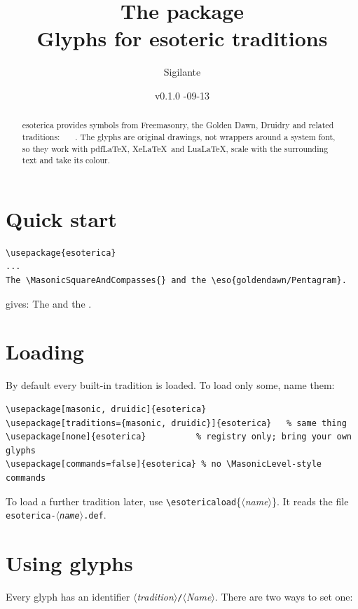 \documentclass[11pt]{article}
\title{The \pkg{esoterica} package\\[0.5ex]
  \large Glyphs for esoteric traditions}
\author{Sigilante}
\date{v0.1.0 \quad 2026-09-13}
\newcommand\pkg[1]{\textsf{#1}}
\newcommand\cs[1]{\texttt{\textbackslash#1}}
\newcommand\meta[1]{\ensuremath{\langle}\textit{#1}\ensuremath{\rangle}}
\begin{document}
\maketitle

\begin{abstract}
\pkg{esoterica} provides symbols from Freemasonry, the Golden Dawn, Druidry
and related traditions: \MasonicSquareAndCompasses\ \GoldenDawnPentagram\
\DruidAwen\ \DruidTriquetra.  The glyphs are original drawings, not wrappers
around a system font, so they work with pdf\LaTeX, Xe\LaTeX\ and Lua\LaTeX,
scale with the surrounding text and take its colour.
\end{abstract}

\tableofcontents

\section{Quick start}

\begin{verbatim}
\usepackage{esoterica}
...
The \MasonicSquareAndCompasses{} and the \eso{goldendawn/Pentagram}.
\end{verbatim}

\noindent gives: The \MasonicSquareAndCompasses{} and the .

\section{Loading}

By default every built-in tradition is loaded.  To load only some, name them:

\begin{verbatim}
\usepackage[masonic, druidic]{esoterica}
\usepackage[traditions={masonic, druidic}]{esoterica}   % same thing
\usepackage[none]{esoterica}          % registry only; bring your own glyphs
\usepackage[commands=false]{esoterica} % no \MasonicLevel-style commands
\end{verbatim}

\noindent To load a further tradition later, use
\cs{esotericaload}\{\meta{name}\}.  It reads the file
\texttt{esoterica-\meta{name}.def}.

\section{Using glyphs}

Every glyph has an identifier \meta{tradition}\texttt{/}\meta{Name}.  There are
two ways to set one:
\end{document}
